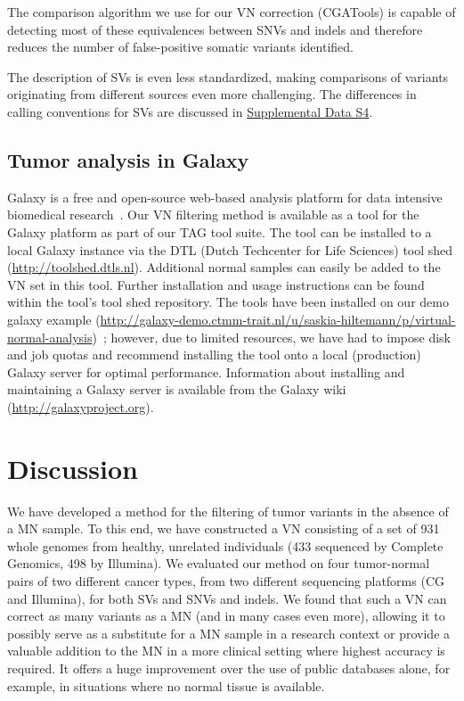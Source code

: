 The comparison algorithm we use for our VN correction (CGATools) is capable of detecting most of these equivalences between SNVs and indels and therefore reduces the number of false-positive somatic variants identified.

The description of SVs is even less standardized, making comparisons of variants originating from different sources even more challenging. The differences in calling conventions for SVs are discussed in \href{https://genome.cshlp.org/content/25/9/1382/suppl/DC1}{Supplemental Data S4}.

\subsection*{Tumor analysis in Galaxy}

Galaxy is a free and open-source web-based analysis platform for data intensive biomedical research~\cite{giardine2005galaxy,blankenberg2010galaxy2,goecks2010galaxy}. Our VN filtering method is available as a tool for the Galaxy platform as part of our TAG tool suite. The tool can be installed to a local Galaxy instance via the DTL (Dutch Techcenter for Life Sciences) tool shed (\url{http://toolshed.dtls.nl}). Additional normal samples can easily be added to the VN set in this tool. Further installation and usage instructions can be found within the tool's tool shed repository. The tools have been installed on our demo galaxy example (\url{http://galaxy-demo.ctmm-trait.nl/u/saskia-hiltemann/p/virtual-normal-analysis})~\cite{hiltemann2014cgtag}; however, due to limited resources, we have had to impose disk and job quotas and recommend installing the tool onto a local (production) Galaxy server for optimal performance. Information about installing and maintaining a Galaxy server is available from the Galaxy wiki (\url{http://galaxyproject.org}).

\section*{Discussion}

We have developed a method for the filtering of tumor variants in the absence of a MN sample. To this end, we have constructed a VN consisting of a set of 931 whole genomes from healthy, unrelated individuals (433 sequenced by Complete Genomics, 498 by Illumina). We evaluated our method on four tumor-normal pairs of two different cancer types, from two different sequencing platforms (CG and Illumina), for both SVs and SNVs and indels. We found that such a VN can correct as many variants as a MN (and in many cases even more), allowing it to possibly serve as a substitute for a MN sample in a research context or provide a valuable addition to the MN in a more clinical setting where highest accuracy is required. It offers a huge improvement over the use of public databases alone, for example, in situations where no normal tissue is available.


